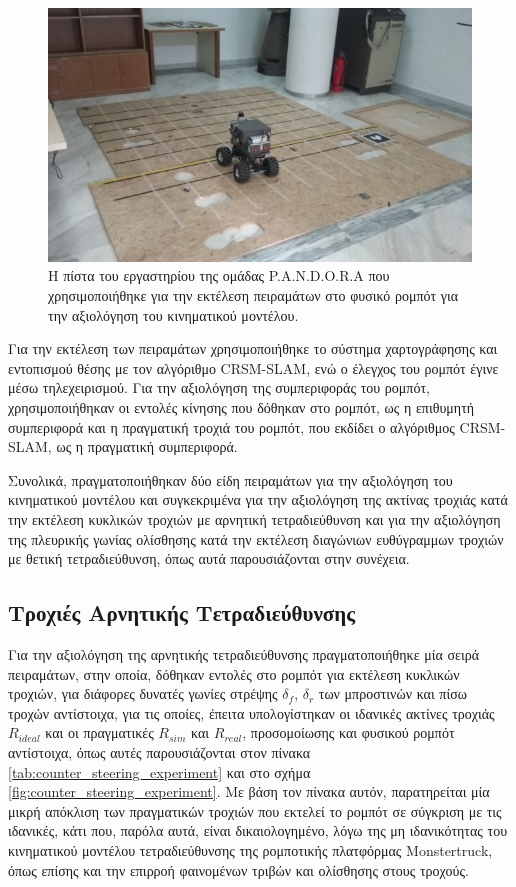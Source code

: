 \begin{figure}[!ht]
	\centering
	\includegraphics[width=\linewidth]{Chapters/Chapter5/Figures/pandora_arena.jpg}
	\caption{Η πίστα του εργαστηρίου της ομάδας P.A.N.D.O.R.A που χρησιμοποιήθηκε για την εκτέλεση πειραμάτων στο φυσικό ρομπότ για την αξιολόγηση του κινηματικού μοντέλου.}
	\label{fig:pandora_circuit}
\end{figure}

\bigskip
Για την εκτέλεση των πειραμάτων χρησιμοποιήθηκε το σύστημα χαρτογράφησης και εντοπισμού θέσης με τον αλγόριθμο CRSM-SLAM, ενώ ο έλεγχος του ρομπότ έγινε μέσω τηλεχειρισμού. Για την αξιολόγηση της συμπεριφοράς του ρομπότ, χρησιμοποιήθηκαν οι εντολές κίνησης που δόθηκαν στο ρομπότ, ως η επιθυμητή συμπεριφορά και η πραγματική τροχιά του ρομπότ, που εκδίδει ο αλγόριθμος CRSM-SLAM, ως η πραγματική συμπεριφορά.

\bigskip
Συνολικά, πραγματοποιήθηκαν δύο είδη πειραμάτων για την αξιολόγηση του κινηματικού μοντέλου και συγκεκριμένα για την αξιολόγηση της ακτίνας τροχιάς κατά την εκτέλεση κυκλικών τροχιών με αρνητική τετραδιεύθυνση και για την αξιολόγηση της πλευρικής γωνίας ολίσθησης κατά την εκτέλεση διαγώνιων ευθύγραμμων τροχιών με θετική τετραδιεύθυνση, όπως αυτά παρουσιάζονται στην συνέχεια.

\subsection{Τροχιές Αρνητικής Τετραδιεύθυνσης}
Για την αξιολόγηση της αρνητικής τετραδιεύθυνσης πραγματοποιήθηκε μία σειρά πειραμάτων, στην οποία, δόθηκαν εντολές στο ρομπότ για εκτέλεση κυκλικών τροχιών, για διάφορες δυνατές γωνίες στρέψης $\delta_f$, $\delta_r$ των μπροστινών και πίσω τροχών αντίστοιχα, για τις οποίες, έπειτα υπολογίστηκαν οι ιδανικές ακτίνες τροχιάς $R_{ideal}$ και οι πραγματικές $R_{sim}$ και $R_{real}$, προσομοίωσης και φυσικού ρομπότ αντίστοιχα, όπως αυτές παρουσιάζονται στον πίνακα \ref{tab:counter_steering_experiment} και στο σχήμα \ref{fig:counter_steering_experiment}. Με βάση τον πίνακα αυτόν, παρατηρείται μία μικρή απόκλιση των πραγματικών τροχιών που εκτελεί το ρομπότ σε σύγκριση με τις ιδανικές, κάτι που, παρόλα αυτά, είναι δικαιολογημένο, λόγω της μη ιδανικότητας του κινηματικού μοντέλου τετραδιεύθυνσης της ρομποτικής πλατφόρμας Monstertruck, όπως επίσης και την επιρροή φαινομένων τριβών και ολίσθησης στους τροχούς.
 
